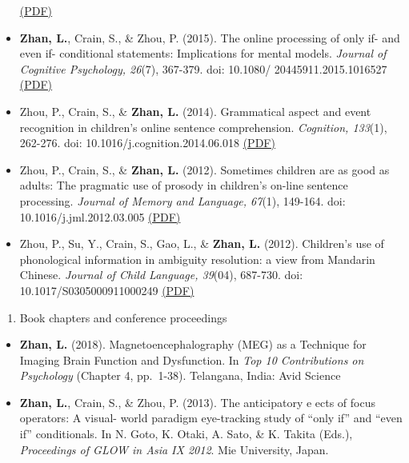 \documentclass[10pt,]{article}
\providecommand{\tightlist}{%
  \setlength{\itemsep}{0pt}\setlength{\parskip}{0pt}}
\begin{document}
\begin{itemize}
  \href{https://publications.likan.info/Periodicals/JChildLang2016.pdf}{(PDF)}
\item
  \textbf{Zhan, L.}, Crain, S., \& Zhou, P. (2015). The online
  processing of only if- and even if- conditional statements:
  Implications for mental models. \emph{Journal of Cognitive Psychology,
  26}(7), 367-379. doi: 10.1080/ 20445911.2015.1016527
  \href{https://publications.likan.info/Periodicals/JCognPsychol2015.pdf}{(PDF)}
\item
  Zhou, P., Crain, S., \& \textbf{Zhan, L.} (2014). Grammatical aspect
  and event recognition in children's online sentence comprehension.
  \emph{Cognition, 133}(1), 262-276. doi:
  10.1016/j.cognition.2014.06.018
  \href{http://publications.likan.info/Periodicals/Cognition2014.pdf}{(PDF)}
\item
  Zhou, P., Crain, S., \& \textbf{Zhan, L.} (2012). Sometimes children
  are as good as adults: The pragmatic use of prosody in children's
  on-line sentence processing. \emph{Journal of Memory and Language,
  67}(1), 149-164. doi: 10.1016/j.jml.2012.03.005
  \href{https://publications.likan.info/Periodicals/JMemLang2012.pdf}{(PDF)}
\item
  Zhou, P., Su, Y., Crain, S., Gao, L., \& \textbf{Zhan, L.} (2012).
  Children's use of phonological information in ambiguity resolution: a
  view from Mandarin Chinese. \emph{Journal of Child Language, 39}(04),
  687-730. doi: 10.1017/S0305000911000249
  \href{https://publications.likan.info/Periodicals/JChildLang2012.pdf}{(PDF)}
\end{itemize}

\begin{enumerate}
\def\labelenumi{\arabic{enumi}.}
\setcounter{enumi}{2}
\tightlist
\item
  Book chapters and conference proceedings
\end{enumerate}

\begin{itemize}
\item
  \textbf{Zhan, L.} (2018). Magnetoencephalography (MEG) as a Technique
  for Imaging Brain Function and Dysfunction. In \emph{Top 10
  Contributions on Psychology} (Chapter 4, pp.~1-38). Telangana, India:
  Avid Science
\item
  \textbf{Zhan, L.}, Crain, S., \& Zhou, P. (2013). The anticipatory e
  ects of focus operators: A visual- world paradigm eye-tracking study
  of ``only if'' and ``even if'' conditionals. In N. Goto, K. Otaki, A.
  Sato, \& K. Takita (Eds.), \emph{Proceedings of GLOW in Asia IX 2012}.
  Mie University, Japan.
\end{itemize}
\end{document}
